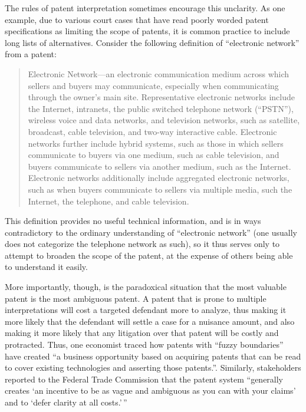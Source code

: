 \documentclass[11pt,twocolumn,titlepage]{article}
\begin{document}
The rules of patent interpretation sometimes encourage this unclarity. As one
example, due to various court cases that have read poorly worded patent
specifications as limiting the scope of patents, it is common practice to
include long lists of alternatives. Consider the following definition of
``electronic network'' from a patent:
\begin{quote}
     Electronic Network---an electronic communication medium across which
     sellers
     and buyers may communicate, especially when communicating through the
     owner's main site. Representative electronic networks include the Internet,
     intranets, the public switched telephone network (``PSTN''), wireless voice
     and data networks, and television networks, such as satellite, broadcast,
     cable television, and two-way interactive cable. Electronic networks
     further include hybrid systems, such as those in which sellers communicate
     to buyers via one medium, such as cable television, and buyers communicate
     to sellers via another medium, such as the Internet. Electronic networks
     additionally include aggregated electronic networks, such as when buyers
     communicate to sellers via multiple media, such the Internet, the
     telephone, and cable television.
\end{quote}
This definition provides no useful technical information, and is in ways
contradictory to the ordinary understanding of ``electronic network'' (one
usually does not categorize the telephone network as such), so it thus serves
only to attempt to broaden the scope of the patent, at the expense of others
being able to understand it easily.

More importantly, though, is the paradoxical situation that the most valuable
patent is the most ambiguous patent. A patent that is prone to multiple
interpretations will cost a targeted defendant more to analyze, thus making it
more likely that the defendant will settle a case for a nuisance amount, and
also making it more likely that any litigation over that patent will be costly
and protracted. Thus, one economist traced how patents with ``fuzzy boundaries''
have created ``a business opportunity based on acquiring patents that can be
read to cover existing technologies and asserting those
patents.''. Similarly, stakeholders reported to
the
Federal Trade Commission that the patent system ``generally creates `an
incentive to be as vague and ambiguous as you can with your claims' and to
`defer clarity at all costs.'\,''
\end{document}
